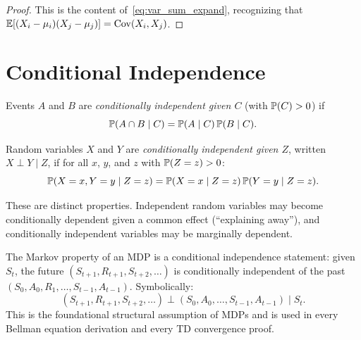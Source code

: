 \documentclass[11pt,a4paper]{article}
\begin{document}
\begin{proof}
This is the content of~\eqref{eq:var_sum_expand}, recognizing
that $\mathbb{E}[(X_i - \mu_i)(X_j - \mu_j)] = \operatorname{Cov}(X_i, X_j)$.
\end{proof}


\section{Conditional Independence}
\label{sec:cond_indep}

\begin{definition}
\label{def:cond_indep_events}
Events $A$ and $B$ are \emph{conditionally independent given $C$}
(with $\mathbb{P}(C) > 0$) if
\begin{equation}
  \mathbb{P}(A \cap B \mid C)
  = \mathbb{P}(A \mid C)\, \mathbb{P}(B \mid C).
  \label{eq:cond_indep_events}
\end{equation}
\end{definition}

\begin{definition}
\label{def:cond_indep_rv}
Random variables $X$ and $Y$ are \emph{conditionally independent
given $Z$}, written $X \perp Y \mid Z$, if for all $x$, $y$, and
$z$ with $\mathbb{P}(Z = z) > 0$:
\begin{equation}
  \mathbb{P}(X = x, Y = y \mid Z = z)
  = \mathbb{P}(X = x \mid Z = z)\, \mathbb{P}(Y = y \mid Z = z).
  \label{eq:cond_indep_rv}
\end{equation}
\end{definition}

\begin{remark}
These are distinct properties.  Independent random variables may
become conditionally dependent given a common effect (``explaining
away''), and conditionally independent variables may be
marginally dependent.
\end{remark}

\begin{rlconnection}[title={The Markov Property as Conditional Independence}]
The Markov property of an MDP is a conditional independence
statement: given $S_t$, the future
$(S_{t+1}, R_{t+1}, S_{t+2}, \ldots)$ is conditionally
independent of the past
$(S_0, A_0, R_1, \ldots, S_{t-1}, A_{t-1})$.  Symbolically:
\[
  (S_{t+1}, R_{t+1}, S_{t+2}, \ldots)
  \perp (S_0, A_0, \ldots, S_{t-1}, A_{t-1})
  \mid S_t.
\]
This is the foundational structural assumption of MDPs and is
used in every Bellman equation derivation and every TD convergence
proof.
\end{rlconnection}
\end{document}
